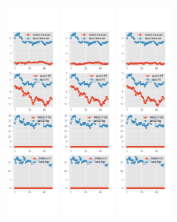 \documentclass[]{article}
\begin{document}
\begin{figure}[htbp]
\begin{subfigure}[b]{\textwidth}
		\includegraphics[width=0.19\textwidth]{figures/sce_ni_est_joint_diag0.png}
		\includegraphics[width=0.19\textwidth]{figures/sce_ni_est_joint_diag1.png}
		\includegraphics[width=0.19\textwidth]{figures/sce_ni_est_joint_diag2.png}

\end{subfigure}
\end{figure}
\end{document}
